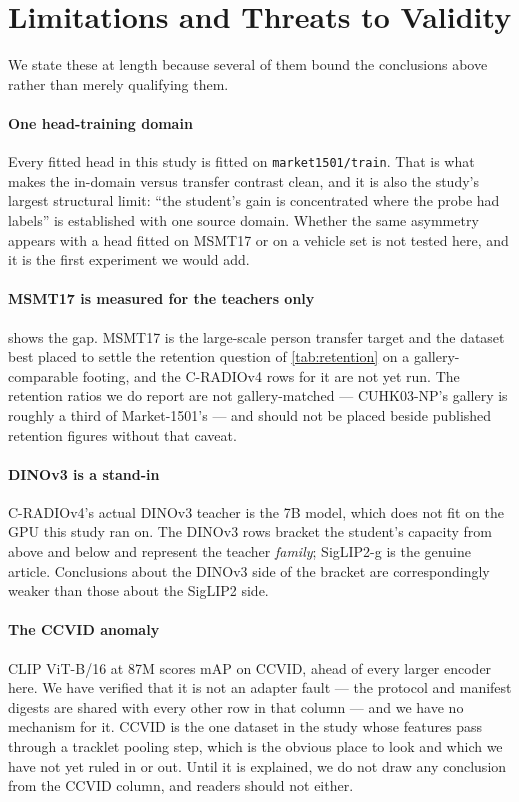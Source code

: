 \section{Limitations and Threats to Validity}\label{sec:limitations}
We state these at length because several of them bound the conclusions above rather than
merely qualifying them.

\paragraph{One head-training domain}
Every fitted head in this study is fitted on \texttt{market1501/train}. That is what makes the
in-domain versus transfer contrast clean, and it is also the study's largest structural limit:
``the student's gain is concentrated where the probe had labels'' is established with one
source domain. Whether the same asymmetry appears with a head fitted on MSMT17 or on a vehicle
set is not tested here, and it is the first experiment we would add.

\paragraph{MSMT17 is measured for the teachers only}
 shows the gap. MSMT17 is the large-scale person transfer target and the
dataset best placed to settle the retention question of \cref{tab:retention} on a
gallery-comparable footing, and the C-RADIOv4 rows for it are not yet run. The retention ratios
we do report are not gallery-matched --- CUHK03-NP's gallery is roughly a third of
Market-1501's --- and should not be placed beside published retention figures without that
caveat.

\paragraph{DINOv3 is a stand-in}
C-RADIOv4's actual DINOv3 teacher is the 7B model, which does not fit on the GPU this
study ran on. The DINOv3 rows bracket the student's capacity from above and below and represent
the teacher \emph{family}; SigLIP2-g is the genuine article. Conclusions about the DINOv3 side
of the bracket are correspondingly weaker than those about the SigLIP2 side.

\paragraph{The CCVID anomaly}
CLIP ViT-B/16 at 87M scores \clipCcvid{} mAP on CCVID, ahead of every larger encoder
here. We have verified that it is not an adapter fault --- the protocol and manifest digests are
shared with every other row in that column --- and we have no mechanism for it. CCVID is the
one dataset in the study whose features pass through a tracklet pooling step, which is the
obvious place to look and which we have not yet ruled in or out. Until it is explained, we do
not draw any conclusion from the CCVID column, and readers should not either.

